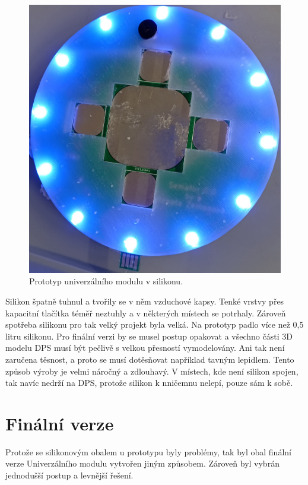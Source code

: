 \begin{figure}[!h]
  \begin{center}
    \includegraphics[scale=0.15]{obrazky/DPS_prototyp_v_silikonu.jpg}
  \end{center}
  \caption[Prototyp univerzálního modulu v silikonu]{Prototyp univerzálního modulu v silikonu.}
\end{figure}

Silikon špatně tuhnul a tvořily se v něm vzduchové kapsy. Tenké vrstvy přes kapacitní tlačítka téměř neztuhly a v některých místech se potrhaly. Zároveň spotřeba silikonu pro tak velký projekt byla velká. 
Na prototyp padlo více než 0,5 litru silikonu. Pro finální verzi by se musel postup opakovat a všechno části 3D modelu DPS musí být pečlivě s velkou přesností vymodelovány. Ani tak není zaručena těsnost,
a proto se musí dotěsňovat například tavným lepidlem. Tento způsob výroby je velmi náročný a zdlouhavý. V místech, kde není silikon spojen, tak navíc nedrží na DPS, protože silikon k nničemnu nelepí, pouze 
sám k sobě. 

\section{Finální verze}
Protože se silikonovým obalem u prototypu byly problémy, tak byl obal finální verze Univerzálního modulu vytvořen jiným způsobem. Zároveň byl vybrán jednodušší postup a levnější řešení. 

